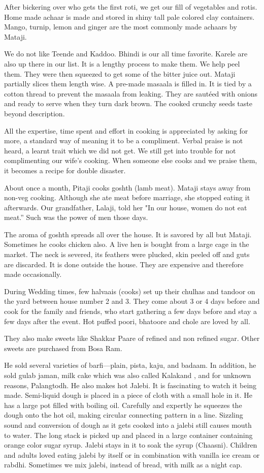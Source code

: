 After bickering over who gets the first roti, we get our fill of
vegetables and rotis. Home made achaar is made and stored in shiny tall
pale colored clay containers. Mango, turnip, lemon and ginger are the most
commonly made achaars by Mataji. 

We do not like Teende and Kaddoo. Bhindi is our all time favorite. Karele
are also up there in our list. It is a lengthy process to make them. We
help peel them. They were then squeezed to get some of the bitter juice
out. Mataji partially slices them length wise. A pre-made masaala is
filled in. It is tied by a cotton thread to prevent the masaala from
leaking. They are sautéed with onions and ready to serve when they turn
dark brown. The cooked crunchy seeds taste beyond description. 

All the expertise, time spent and effort in cooking is appreciated by
asking for more, a standard way of meaning it to be a compliment. Verbal
praise is not heard, a learnt trait which we did not get. We still get
into trouble for not complimenting our wife's cooking. When someone else
cooks and we praise them, it becomes a recipe for double disaster. 

About once a month, Pitaji cooks goshth (lamb meat). Mataji stays away
from non-veg cooking. Although she ate meat before marriage, she stopped
eating it afterwards. Our grandfather, Lalaji, told her "In our house,
women do not eat meat.” Such was the power of men those days. 

The aroma of goshth spreads all over the house. It is savored by all but
Mataji. Sometimes he cooks chicken also. A live hen is bought from a large
cage in the market. The neck is severed, its feathers were plucked, skin
peeled off and guts are discarded. It is done outside the house. They are
expensive and therefore made occasionally. 

During Wedding times, few halvaais (cooks) set up their chulhas and
tandoor on the yard between house number 2 and 3. They come about 3 or
4 days before and cook for the family and friends, who start gathering
a few days before and stay a few days after the event. Hot puffed poori,
bhatoore and chole are loved by all. 

They also make sweets like Shakkar Paare of refined and non refined sugar.
Other sweets are purchased from Bosa Ram. 

He sold several varieties of barfi—plain, pista, kaju, and badaam. In
addition, he sold gulab jaman, milk cake which was also called Kalakand
, and for unknown reasons, Palangtodh. He also makes hot Jalebi. It is
fascinating to watch it being made. Semi-liquid dough is placed in a piece
of cloth with a small hole in it. He has a large pot filled with boiling
oil. Carefully and expertly he squeezes the dough onto the hot oil, making
circular connecting pattern in a line. Sizzling sound and conversion of
dough as it gets cooked into a jalebi still causes mouth to water. The
long stack is picked up and placed in a large container containing orange
color sugar syrup. Jalebi stays in it to soak the syrup (Chaasni).
Children and adults loved eating jalebi by itself or in combination with
vanilla ice cream or rabdhi. Sometimes we mix jalebi, instead of bread,
with milk as a night cap. 

